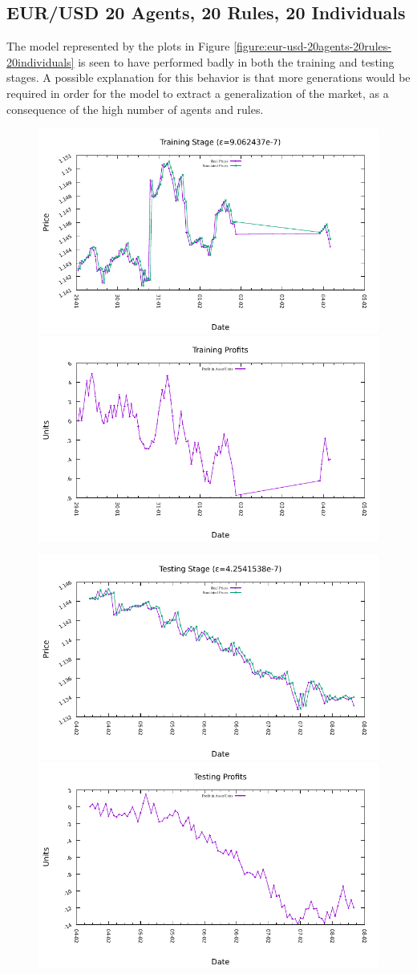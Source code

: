 \newpage

\subsection{EUR/USD 20 Agents, 20 Rules, 20 Individuals}
\label{results:forecast-eur-usd-20agents-20rules-20individuals}

The model represented by the plots in Figure \ref{figure:eur-usd-20agents-20rules-20individuals} is seen to have performed badly in both the training and testing stages. A possible explanation for this behavior is that more generations would be required in order for the model to extract a generalization of the market, as a consequence of the high number of agents and rules. 

\begin{figure}[htp]
  \centering

  \includegraphics[width=.45\textwidth]{img/plots/eur_usd_h1-20agents-20rules-20ind-100gen_training_fit.pdf}\quad
  \includegraphics[width=.45\textwidth]{img/plots/eur_usd_h1-20agents-20rules-20ind-100gen_training_profits.pdf}

  \medskip

  \includegraphics[width=.45\textwidth]{img/plots/eur_usd_h1-20agents-20rules-20ind-100gen_testing_fit.pdf}\quad
  \includegraphics[width=.45\textwidth]{img/plots/eur_usd_h1-20agents-20rules-20ind-100gen_testing_profits.pdf}


\end{figure}
